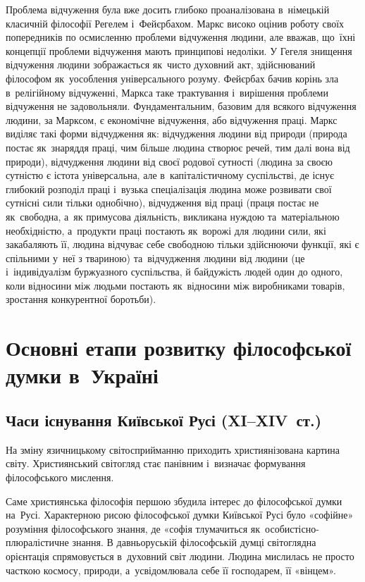 \documentclass[a5paper,oneside,DIV=12,12pt,headings=small]{scrartcl}
\begin{document}
		Проблема відчуження була вже досить глибоко проаналізована в~німецькій класичній філософії Регелем і~Фейєрбахом. Маркс високо оцінив роботу своїх попередників по осмисленню проблеми відчуження людини, але вважав, що~їхні концепції проблеми відчуження мають принципові недоліки. У Гегеля знищення відчуження людини зображається як~чисто духовний акт, здійснюваний філософом як~уособлення універсального розуму. Фейєрбах бачив корінь зла в~релігійному відчуженні, Маркса таке трактування і~вирішення проблеми відчуження не задовольняли. Фундаментальним, базовим для всякого відчуження людини, за Марксом, є економічне відчуження, або відчуження праці. Маркс виділяє такі форми відчудження як: відчудження людини від природи (природа постає як~знаряддя праці, чим більше людина створює речей, тим далі вона від природи), відчудження людини від своєї родової сутності (людина за своєю сутністю є істота універсальна, але в~капіталістичному суспільстві, де існує глибокий розподіл праці і~вузька спеціалізація людина може розвивати свої сутнісні сили тільки однобічно), відчудження від праці (праця постає не як~свободна, а~як примусова діяльність, викликана нуждою та~матеріальною необхідністю, а~продукти праці постають як~ворожі для людини сили, які закабаляють її, людина відчуває себе свободною тільки здійснюючи функції, які є спільними у~неї з твариною) та~відчудження людини від людини (це і~індивідуалізм буржуазного суспільства, й байдужість людей один до одного, коли відносини між людьми постають як~відносини між виробниками товарів, зростання конкурентної боротьби).
		
	\section{Основні етапи розвитку філософської думки в~Україні}
		\subsection{Часи існування Київської Русі (XI–XIV~ст.)}
			На зміну язичницькому світосприйманню приходить християнізована картина світу. Християнський світогляд стає панівним і~визначає формування філософського мислення.
			
			Саме християнська філософія першою збудила інтерес до філософської думки на~Русі. Характерною рисою філософської думки Київської Русі було «софійне» розуміння філософського знання, де «софія тлумачиться як~особистісно-плюралістичне знання. В давньоруській філософській думці світоглядна орієнтація спрямовується в~духовний світ людини. Людина мислилась не просто часткою космосу, природи, а~усвідомлювала себе її господарем, її «вінцем».
			
\end{document}
